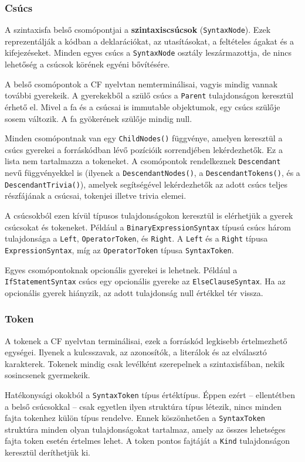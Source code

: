 \documentclass[12pt, a4paper]{report}
\newcommand{\f}[1]{\texttt{#1}}
\newcommand{\bb}[1]{\textbf{#1}}
\begin{document}
\subsubsection{Csúcs}

A szintaxisfa belső csomópontjai a \bb{szintaxiscsúcsok} (\f{SyntaxNode}). Ezek reprezentálják a kódban a deklarációkat, az utasításokat, a feltételes ágakat és a kifejezéseket. Minden egyes csúcs a \f{SyntaxNode} osztály leszármazottja, de nincs lehetőség a csúcsok körének egyéni bővítésére.

A belső csomópontok a CF nyelvtan nemterminálisai, vagyis mindig vannak további gyerekeik. A gyerekekből a szülő csúcs a \f{Parent} tulajdonságon keresztül érhető el. Mivel a fa és a csúcsai is immutable objektumok, egy csúcs szülője sosem változik. A fa gyökerének szülője mindig null.

Minden csomópontnak van egy \f{ChildNodes()} függvénye, amelyen keresztül a csúcs gyerekei a forráskódban lévő pozícióik sorrendjében lekérdezhetők. Ez a lista nem tartalmazza a tokeneket. A csomópontok rendelkeznek \f{Descendant} nevű függvényekkel is (ilyenek a \f{DescendantNodes()}, a \f{DescendantTokens()}, és a \f{DescendantTrivia()}), amelyek segítségével lekérdezhetők az adott csúcs teljes részfájának a csúcsai, tokenjei illetve trivia elemei.

A csúcsokból ezen kívül típusos tulajdonságokon keresztül is elérhetjük a gyerek csúcsokat és tokeneket. Például a \f{BinaryExpressionSyntax} típusú csúcs három tulajdonsága a \f{Left}, \f{OperatorToken}, és \f{Right}. A \f{Left} és a \f{Right} típusa \f{ExpressionSyntax}, míg az \f{OperatorToken} típusa \f{SyntaxToken}.

Egyes csomópontoknak opcionális gyerekei is lehetnek. Például a \f{IfStatementSyntax} csúcs egy opcionális gyereke az \f{ElseClauseSyntax}. Ha az opcionális gyerek hiányzik, az adott tulajdonság null értékkel tér vissza.

\subsubsection{Token}

A tokenek a CF nyelvtan terminálisai, ezek a forráskód legkisebb értelmezhető egységei. Ilyenek a kulcsszavak, az azonosítók, a literálok és az elválasztó karakterek. Tokenek mindig csak levélként szerepelnek a szintaxisfában, nekik sosincsenek gyermekeik. 

Hatékonysági okokból a \f{SyntaxToken} típus értéktípus. Éppen ezért -- ellentétben a belső csúcsokkal -- csak egyetlen ilyen struktúra típus létezik, nincs minden fajta tokenhez külön típus rendelve. Ennek köszönhetően a \f{SyntaxToken} struktúra minden olyan tulajdonságokat tartalmaz, amely az összes lehetséges fajta token esetén értelmes lehet. A token pontos fajtáját a \f{Kind} tulajdonságon keresztül deríthetjük ki.
\end{document}
